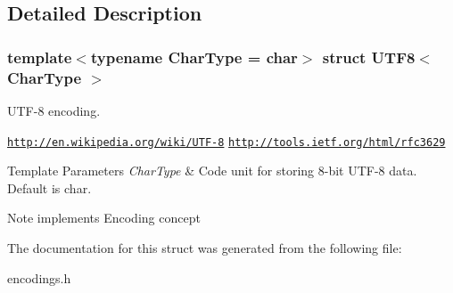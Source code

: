 \subsection{Detailed Description}
\subsubsection*{template$<$typename Char\+Type = char$>$\newline
struct U\+T\+F8$<$ Char\+Type $>$}

U\+T\+F-\/8 encoding. 

\href{http://en.wikipedia.org/wiki/UTF-8}{\tt http\+://en.\+wikipedia.\+org/wiki/\+U\+T\+F-\/8} \href{http://tools.ietf.org/html/rfc3629}{\tt http\+://tools.\+ietf.\+org/html/rfc3629} 
\begin{DoxyTemplParams}{Template Parameters}
{\em Char\+Type} & Code unit for storing 8-\/bit U\+T\+F-\/8 data. Default is char. \\
\hline
\end{DoxyTemplParams}
\begin{DoxyNote}{Note}
implements Encoding concept 
\end{DoxyNote}


The documentation for this struct was generated from the following file\+:\begin{DoxyCompactItemize}
\item 
encodings.\+h\end{DoxyCompactItemize}
